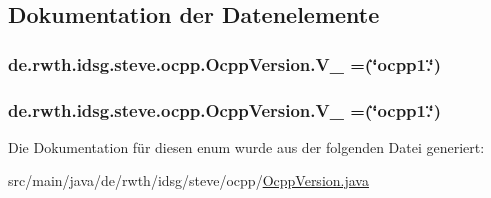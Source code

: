 \subsection{Dokumentation der Datenelemente}
\hypertarget{enumde_1_1rwth_1_1idsg_1_1steve_1_1ocpp_1_1_ocpp_version_a02a262b834136db4a30bb9a821c77574}{
\subsubsection[{V\+\_\+12}]{\setlength{\rightskip}{0pt plus 5cm}de.\+rwth.\+idsg.\+steve.\+ocpp.\+Ocpp\+Version.\+V\+\_ =(\char`\"{}ocpp1.\char`\"{})}}\label{enumde_1_1rwth_1_1idsg_1_1steve_1_1ocpp_1_1_ocpp_version_a02a262b834136db4a30bb9a821c77574}
\hypertarget{enumde_1_1rwth_1_1idsg_1_1steve_1_1ocpp_1_1_ocpp_version_a73e998996dec6fa643fc3241249866d4}{
\subsubsection[{V\+\_\+15}]{\setlength{\rightskip}{0pt plus 5cm}de.\+rwth.\+idsg.\+steve.\+ocpp.\+Ocpp\+Version.\+V\+\_ =(\char`\"{}ocpp1.\char`\"{})}}\label{enumde_1_1rwth_1_1idsg_1_1steve_1_1ocpp_1_1_ocpp_version_a73e998996dec6fa643fc3241249866d4}


Die Dokumentation für diesen enum wurde aus der folgenden Datei generiert\+:\begin{DoxyCompactItemize}
\item 
src/main/java/de/rwth/idsg/steve/ocpp/\hyperlink{_ocpp_version_8java}{Ocpp\+Version.\+java}\end{DoxyCompactItemize}
